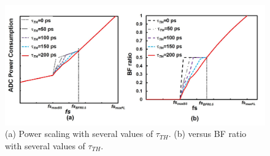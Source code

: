 \begin{figure}
\centering
  \includegraphics[width=1\textwidth]{figure/chap3/fig12.jpg}
  \caption{ (a) Power scaling with several values of $\tau_{TH}$. (b) versus BF ratio with several values of $\tau_{TH}$.}
  \label{fig-3-12}
\end{figure}

